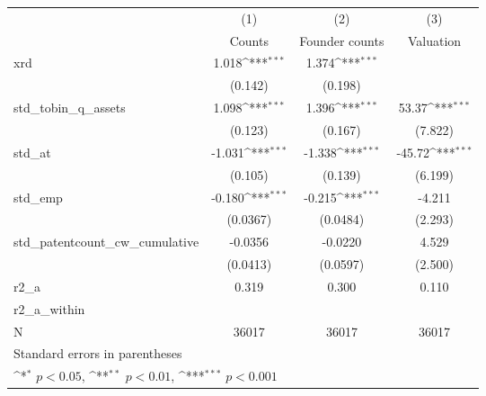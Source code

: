 {
\def\sym#1{\ifmmode^{#1}\else\(^{#1}\)\fi}
\begin{tabular}{l*{3}{c}}
\hline\hline
            &\multicolumn{1}{c}{(1)}&\multicolumn{1}{c}{(2)}&\multicolumn{1}{c}{(3)}\\
            &\multicolumn{1}{c}{Counts}&\multicolumn{1}{c}{Founder counts}&\multicolumn{1}{c}{Valuation}\\
\hline
xrd         &       1.018\sym{***}&       1.374\sym{***}&                     \\
            &     (0.142)         &     (0.198)         &                     \\
[1em]
std\_tobin\_q\_assets&       1.098\sym{***}&       1.396\sym{***}&       53.37\sym{***}\\
            &     (0.123)         &     (0.167)         &     (7.822)         \\
[1em]
std\_at      &      -1.031\sym{***}&      -1.338\sym{***}&      -45.72\sym{***}\\
            &     (0.105)         &     (0.139)         &     (6.199)         \\
[1em]
std\_emp     &      -0.180\sym{***}&      -0.215\sym{***}&      -4.211         \\
            &    (0.0367)         &    (0.0484)         &     (2.293)         \\
[1em]
std\_patentcount\_cw\_cumulative&     -0.0356         &     -0.0220         &       4.529         \\
            &    (0.0413)         &    (0.0597)         &     (2.500)         \\
\hline
r2\_a        &       0.319         &       0.300         &       0.110         \\
r2\_a\_within &                     &                     &                     \\
N           &       36017         &       36017         &       36017         \\
\hline\hline
\multicolumn{4}{l}{\footnotesize Standard errors in parentheses}\\
\multicolumn{4}{l}{\footnotesize \sym{*} \(p<0.05\), \sym{**} \(p<0.01\), \sym{***} \(p<0.001\)}\\
\end{tabular}
}
